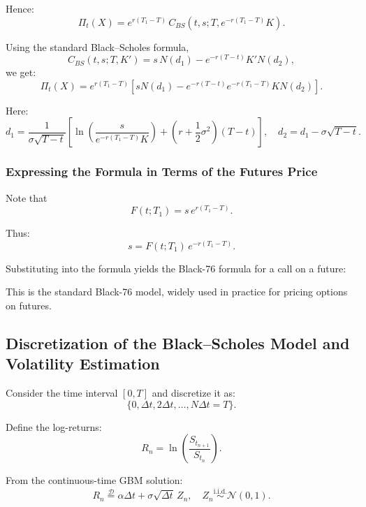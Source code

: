 \documentclass[12pt,a4paper]{article}
\theoremstyle{definition}
\begin{document}
Hence:
\[
\Pi_t(X) = e^{r(T_1 - T)} \, C_{BS}(t, s; T, e^{-r(T_1 - T)} K).
\]

Using the standard Black–Scholes formula,
\[
C_{BS}(t, s; T, K') = s \, N(d_1) - e^{-r(T-t)} K' N(d_2),
\]
we get:
\[
\Pi_t(X) = e^{r(T_1 - T)} [s N(d_1) - e^{-r(T-t)} e^{-r(T_1 - T)} K N(d_2)].
\]

Here:
\[
d_1 = \frac{1}{\sigma\sqrt{T-t}} \left[\ln\left(\frac{s}{e^{-r(T_1 - T)} K}\right) + \left(r + \frac{1}{2}\sigma^2\right)(T-t)\right], \quad d_2 = d_1 - \sigma\sqrt{T-t}.
\]

\subsubsection{Expressing the Formula in Terms of the Futures Price}

Note that
\[
F(t; T_1) = s \, e^{r(T_1 - T)}.
\]

Thus:
\[
s = F(t; T_1) \, e^{-r(T_1 - T)}.
\]

Substituting into the formula yields the Black-76 formula for a call on a future:

\begin{center}
\end{center}

This is the standard Black-76 model, widely used in practice for pricing options on futures.

\subsection{Discretization of the Black–Scholes Model and Volatility Estimation}

Consider the time interval $[0, T]$ and discretize it as:
\[
\{0, \Delta t, 2\Delta t, \ldots, N\Delta t = T\}.
\]

Define the log-returns:
\[
R_n = \ln\left(\frac{S_{t_{n+1}}}{S_{t_n}}\right).
\]

From the continuous-time GBM solution:
\[
R_n \stackrel{\mathcal D}{=} \alpha \Delta t + \sigma \sqrt{\Delta t} \, Z_n, \quad Z_n \stackrel{\text{i.i.d.}}{\sim} \mathcal{N}(0,1).
\]
\end{document}
